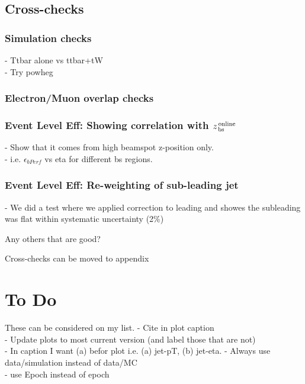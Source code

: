 \FloatBarrier
\newpage

\subsection{Cross-checks}
\subsubsection{Simulation checks}
- Ttbar alone vs ttbar+tW\\
- Try powheg
\subsubsection{Electron/Muon overlap checks}
\subsubsection{Event Level Eff: Showing correlation with $z_{\,\text{bs}}^{\text{\,online}}$}
- Show that it comes from high beamspot z-position only.\\
- i.e. $\epsilon_{bPerf}$ vs eta for different bs regions.
\subsubsection{Event Level Eff: Re-weighting of sub-leading jet}
- We did a test where we applied correction to leading and showes the subleading was flat within systematic uncertainty (2\%)

Any others that are good?

Cross-checks can be moved to appendix

\section{To Do}

These can be considered on my list.
\noindent
- Cite in plot caption\\
- Update plots to most current version (and label those that are not)\\
- In caption I want (a) befor plot i.e. (a) jet-pT, (b) jet-eta.
- Always use data/simulation instead of data/MC\\
- use Epoch instead of epoch\\
